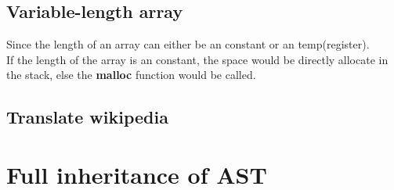 \documentclass[nocopyrightspace]{sigplanconf}
\begin{document}
\subsection{Variable-length array}
Since the length of an array can either be an constant or an temp(register). \\
If the length of the array is an constant, the space would be directly allocate in the stack, else the \textbf{malloc} function would be called.
\subsection{Translate wikipedia}

\appendix

\section{Full inheritance of AST}
\end{document}
